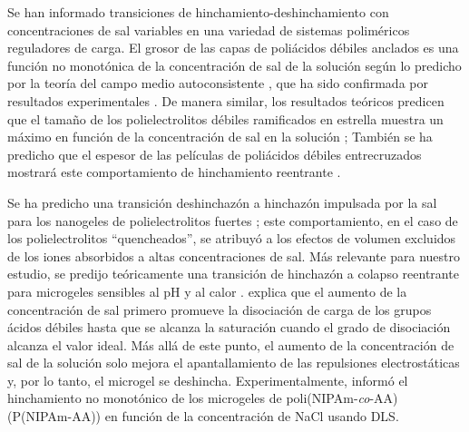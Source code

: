 Se han informado transiciones de hinchamiento-deshinchamiento con concentraciones de sal variables en una variedad de sistemas polim\'ericos reguladores de carga.
El grosor de las capas de poli\'acidos d\'ebiles anclados es una funci\'on no monot\'onica de la concentraci\'on de sal de la soluci\'on seg\'un lo predicho por la teor\'ia del campo medio autoconsistente  \cite{Israels1994,Lyatskaya1995,Zhulina1995,Gong2007}, que ha sido confirmada por resultados experimentales \cite{Wu2007}.
De manera similar, los resultados te\'oricos predicen que el tama\~no de los polielectrolitos d\'ebiles ramificados en estrella muestra un m\'aximo en funci\'on de la concentraci\'on de sal en la soluci\'on  \cite{Borisov1998,KleinWolterink2002};
Tambi\'en se ha predicho que el espesor de las pel\'iculas de poliácidos d\'ebiles entrecruzados mostrar\'a este comportamiento de hinchamiento reentrante \cite{Longo2014JCP}.

Se ha predicho una transici\'on deshinchaz\'on a hinchaz\'on impulsada por la sal para los nanogeles de polielectrolitos fuertes \cite{jha2012understanding};
este comportamiento, en el caso de los polielectrolitos ``quencheados'', se atribuy\'o a los efectos de volumen excluidos de los iones absorbidos a altas concentraciones de sal.
M\'as relevante para nuestro estudio, se predijo te\'oricamente una transici\'on de hinchaz\'on a colapso reentrante para microgeles sensibles al pH y al calor \cite{polotsky2013collapse}.
 \citet{polotsky2013collapse} explica que el aumento de la concentraci\'on de sal primero promueve la disociaci\'on de carga de los grupos \'acidos d\'ebiles hasta que se alcanza la saturaci\'on cuando el grado de disociaci\'on alcanza el valor ideal.
M\'as all\'a de este punto, el aumento de la concentraci\'on de sal de la soluci\'on solo mejora el apantallamiento de las repulsiones electrost\'aticas y, por lo tanto, el microgel se deshincha.
Experimentalmente,  \citet{CaprilesGonzalez2008} inform\'o el hinchamiento no monot\'onico de los microgeles de poli(NIPAm-\emph{co}-AA) (P(NIPAm-AA)) en funci\'on de la concentraci\'on de NaCl usando DLS.

